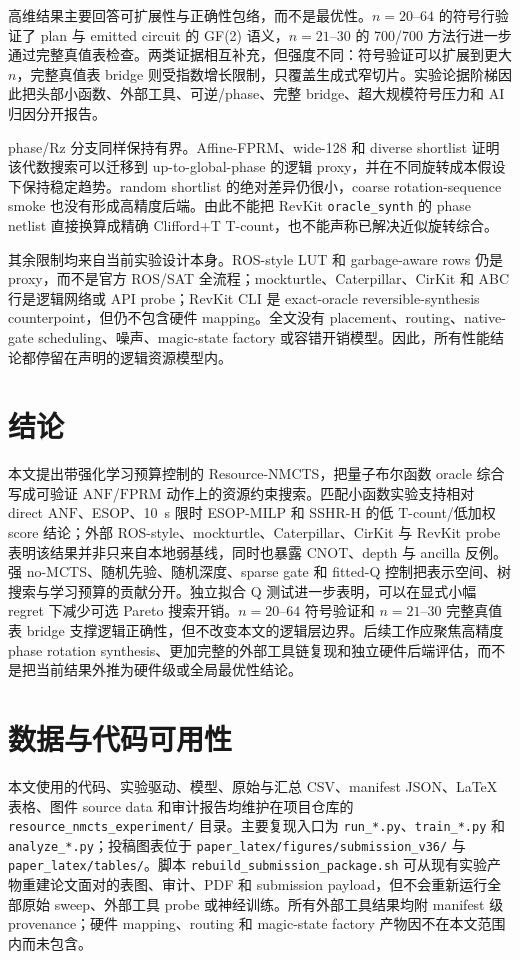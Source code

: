\documentclass[UTF8,fontset=fandol,11pt]{ctexart}
\newcommand{\method}{Resource-NMCTS}
\newcommand{\anf}{\ensuremath{\mathrm{ANF}}}
\newcommand{\fprm}{\ensuremath{\mathrm{FPRM}}}
\newcommand{\mcts}{\ensuremath{\mathrm{MCTS}}}
\begin{document}
高维结果主要回答可扩展性与正确性包络，而不是最优性。$n=20$--$64$ 的符号行验证了 plan 与 emitted circuit 的 GF(2) 语义，$n=21$--$30$ 的 700/700 方法行进一步通过完整真值表检查。两类证据相互补充，但强度不同：符号验证可以扩展到更大 $n$，完整真值表 bridge 则受指数增长限制，只覆盖生成式窄切片。实验论据阶梯因此把头部小函数、外部工具、可逆/phase、完整 bridge、超大规模符号压力和 AI 归因分开报告。

phase/Rz 分支同样保持有界。Affine-FPRM、wide-128 和 diverse shortlist 证明该代数搜索可以迁移到 up-to-global-phase 的逻辑 proxy，并在不同旋转成本假设下保持稳定趋势。random shortlist 的绝对差异仍很小，coarse rotation-sequence smoke 也没有形成高精度后端。由此不能把 RevKit \texttt{oracle\_synth} 的 phase netlist 直接换算成精确 Clifford+T T-count，也不能声称已解决近似旋转综合。

其余限制均来自当前实验设计本身。ROS-style LUT 和 garbage-aware rows 仍是 proxy，而不是官方 ROS/SAT 全流程；mockturtle、Caterpillar、CirKit 和 ABC 行是逻辑网络或 API probe；RevKit CLI 是 exact-oracle reversible-synthesis counterpoint，但仍不包含硬件 mapping。全文没有 placement、routing、native-gate scheduling、噪声、magic-state factory 或容错开销模型。因此，所有性能结论都停留在声明的逻辑资源模型内。

\section{结论}

本文提出带强化学习预算控制的 \method{}，把量子布尔函数 oracle 综合写成可验证 \anf{}/\fprm{} 动作上的资源约束搜索。匹配小函数实验支持相对 direct \anf{}、ESOP、10~s 限时 ESOP-MILP 和 SSHR-H 的低 T-count/低加权 score 结论；外部 ROS-style、mockturtle、Caterpillar、CirKit 与 RevKit probe 表明该结果并非只来自本地弱基线，同时也暴露 CNOT、depth 与 ancilla 反例。强 no-\mcts{}、随机先验、随机深度、sparse gate 和 fitted-Q 控制把表示空间、树搜索与学习预算的贡献分开。独立拟合 Q 测试进一步表明，可以在显式小幅 regret 下减少可选 Pareto 搜索开销。$n=20$--$64$ 符号验证和 $n=21$--$30$ 完整真值表 bridge 支撑逻辑正确性，但不改变本文的逻辑层边界。后续工作应聚焦高精度 phase rotation synthesis、更加完整的外部工具链复现和独立硬件后端评估，而不是把当前结果外推为硬件级或全局最优性结论。

\section*{数据与代码可用性}

本文使用的代码、实验驱动、模型、原始与汇总 CSV、manifest JSON、LaTeX 表格、图件 source data 和审计报告均维护在项目仓库的 \texttt{resource\_nmcts\_experiment/} 目录。主要复现入口为 \texttt{run\_*.py}、\texttt{train\_*.py} 和 \texttt{analyze\_*.py}；投稿图表位于 \texttt{paper\_latex/figures/submission\_v36/} 与 \texttt{paper\_latex/tables/}。脚本 \texttt{rebuild\_submission\_package.sh} 可从现有实验产物重建论文面对的表图、审计、PDF 和 submission payload，但不会重新运行全部原始 sweep、外部工具 probe 或神经训练。所有外部工具结果均附 manifest 级 provenance；硬件 mapping、routing 和 magic-state factory 产物因不在本文范围内而未包含。
\end{document}
